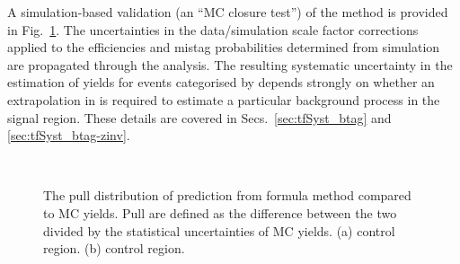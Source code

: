 A simulation-based validation (\ie an ``MC closure test'') of the
method is provided in Fig.~\ref{fig:formulavalidation}. The
uncertainties in the data/simulation scale factor corrections applied
to the efficiencies and mistag probabilities determined from
simulation are propagated through the analysis. The resulting
systematic uncertainty in the estimation of yields for events
categorised by \nb depends strongly on whether an extrapolation in \nb
is required to estimate a particular background process in the signal
region. These details are covered in Secs.~\ref{sec:tfSyst_btag} and
\ref{sec:tfSyst_btag-zinv}.

\begin{figure}[h!]
  \centering
   ~
  \caption{The pull distribution of prediction from formula method compared to MC yields. Pull 
  are defined as the difference between the two divided by the statistical uncertainties of MC yields.
  (a) \mj control region. (b) \mmj control region.}
  \label{fig:formulavalidation}
\end{figure}

